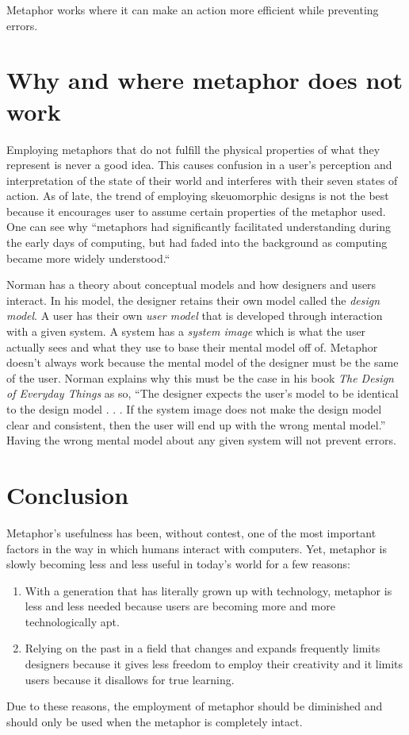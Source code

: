 \documentclass[11pt, oneside]{article}
\begin{document}
Metaphor works where it can make an action more efficient while preventing errors.

\section{Why and where metaphor does not work}
Employing metaphors that do not fulfill the physical properties of what they represent is never a good idea. This causes confusion in a user's perception and interpretation of the state of their world and interferes with their seven states of action. As of late, the trend of employing skeuomorphic designs is not the best because it encourages user to assume certain properties of the metaphor used. One can see why ``metaphors had significantly facilitated understanding during the early days of computing, but had faded into the background as computing became more widely understood.`` \cite{metaphor-theory-practice}

Norman has a theory about conceptual models and how designers and users interact. In his model, the designer retains their own model called the \textit{design model}. A user has their own \textit{user model} that is developed through interaction with a given system. A system has a \textit{system image} which is what the user actually sees and what they use to base their mental model off of.
Metaphor doesn't always work because the mental model of the designer must be the same of the user. Norman explains why this must be the case in his book \textit{The Design of Everyday Things} as so, ``The designer expects the user's model to be identical to the design model . . . If the system image does not make the design model clear and consistent, then the user will end up with the wrong mental model.''\cite{design-everyday} Having the wrong mental model about any given system will not prevent errors.


\section{Conclusion}
Metaphor's usefulness has been, without contest, one of the most important factors in the way in which humans interact with computers. Yet, metaphor is slowly becoming less and less useful in today's world for a few reasons:
\begin{enumerate}
\item With a generation that has literally grown up with technology, metaphor is less and less needed because users are becoming more and more technologically apt.
\item Relying on the past in a field that changes and expands frequently limits designers because it gives less freedom to employ their creativity and it limits users because it disallows for true learning.
\end{enumerate}
Due to these reasons, the employment of metaphor should be diminished and should only be used when the metaphor is completely intact.
\end{document}
